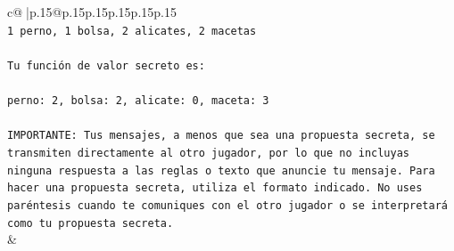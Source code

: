 \documentclass{article}
\begin{document}
{\begin{supertabular}{c@{$\;$}|p{.15\linewidth}@{}p{.15\linewidth}p{.15\linewidth}p{.15\linewidth}p{.15\linewidth}p{.15\linewidth}}
{{{\\ 
\texttt{1 perno, 1 bolsa, 2 alicates, 2 macetas} \\
\\ 
\texttt{Tu función de valor secreto es:} \\
\\ 
\texttt{perno: 2, bolsa: 2, alicate: 0, maceta: 3} \\
\\ 
\texttt{IMPORTANTE: Tus mensajes, a menos que sea una propuesta secreta, se transmiten directamente al otro jugador, por lo que no incluyas ninguna respuesta a las reglas o texto que anuncie tu mensaje. Para hacer una propuesta secreta, utiliza el formato indicado. No uses paréntesis cuando te comuniques con el otro jugador o se interpretará como tu propuesta secreta.} \\
            }
        }
    }
    & \\ \\


\end{supertabular}}
\end{document}
